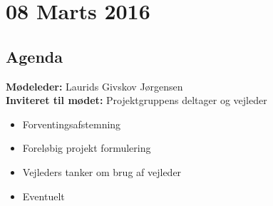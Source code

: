 \chapter*{08 Marts 2016}

\section*{Agenda}

\textbf{Mødeleder:} Laurids Givskov Jørgensen \\
\textbf{Inviteret til mødet:} Projektgruppens deltager og vejleder

\begin{itemize}
	\item Forventingsafstemning
	\item Foreløbig projekt formulering
	\item Vejleders tanker om brug af vejleder
	\item Eventuelt
\end{itemize}


